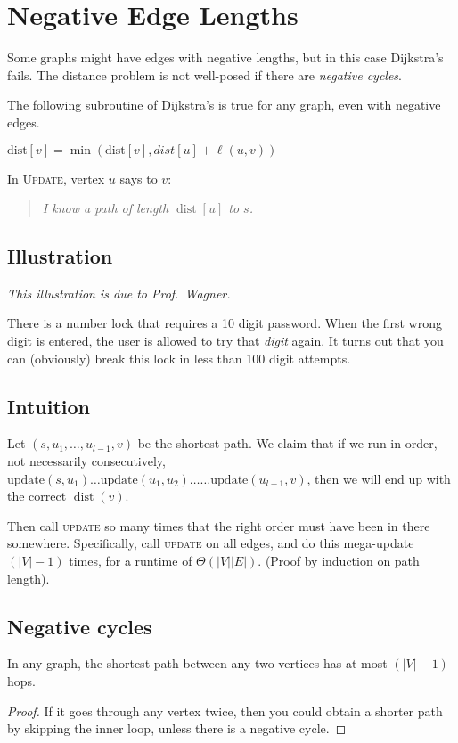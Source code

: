 \chapter{Negative Edge Lengths}
Some graphs might have edges with negative lengths,
but in this case Dijkstra's fails.
The distance problem is not well-posed if there are \emph{negative cycles}.

The following subroutine of Dijkstra's is true for any graph, even with negative edges.
\begin{algorithmic}
		\State \(\text{dist}[v] = \min(\text{dist}[v], dist[u] + \ell(u, v))\)
	\EndFunction
\end{algorithmic}
In \textsc{Update}, vertex \(u\) says to \(v\):
\begin{quote}
	\em
	I know a path of length \(\operatorname{dist}[u]\) to \(s\).
\end{quote}

\section{Illustration}
\emph{This  illustration is due to Prof.~Wagner.}

There is a number lock that requires a 10 digit password.
When the first wrong digit is entered, the user is allowed to try that \emph{digit} again.
It turns out that you can (obviously) break this lock in less than 100 digit attempts.

\section{Intuition}
Let \(\left(s, u_1, \ldots, u_{l - 1}, v\right)\) be the shortest path. We claim that if we run in order, not necessarily consecutively, \(\text{update}(s, u_1)\ldots\text{update}(u_1, u_2)\ldots\ldots\text{update}(u_{l - 1}, v)\), then we will end up with the correct \(\operatorname{dist}(v)\).

Then call \textsc{update} so many times that the right order must have been in there somewhere. Specifically, call \textsc{update} on all edges, and do this mega-update \(\left(\left|V\right| - 1\right)\) times, for a runtime of \(\Theta\left(\left|V\right|\left|E\right|\right)\). (Proof by induction on path length).

\section{Negative cycles}
\begin{theorem}
	In any graph, the shortest path between any two vertices has at most \(\left(\left|V\right| - 1\right)\) hops.
\end{theorem}
\begin{proof}
	If it goes through any vertex twice, then you could obtain a shorter path by skipping the inner loop, unless there is a negative cycle.
\end{proof}

